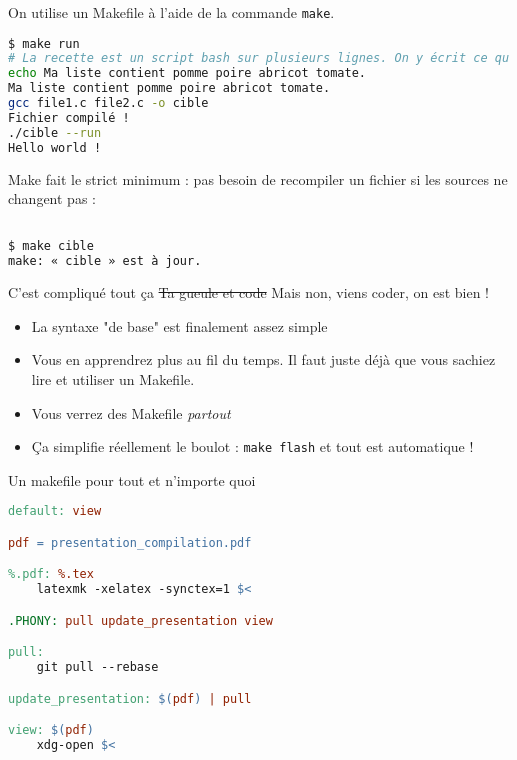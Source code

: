 \begin{frame}[fragile]
\frametitle{\insertsubsubsection}

On utilise un Makefile à l'aide de la commande \texttt{make}.

\begin{lstlisting}[language=bash]
$ make run
# La recette est un script bash sur plusieurs lignes. On y écrit ce qu'on veut.
echo Ma liste contient pomme poire abricot tomate.
Ma liste contient pomme poire abricot tomate.
gcc file1.c file2.c -o cible
Fichier compilé !
./cible --run
Hello world !
\end{lstlisting}



Make fait le strict minimum : pas besoin de recompiler un fichier si les sources ne changent pas :

\begin{lstlisting}[language=bash]

$ make cible
make: « cible » est à jour.
\end{lstlisting}
\end{frame}

\begin{frame}{C'est compliqué tout ça\…}
\sout{Ta gueule et code} Mais non, viens coder, on est bien !

\begin{itemize}
  \item La syntaxe "de base" est finalement assez simple
  \item Vous en apprendrez plus au fil du temps. Il faut juste déjà que vous sachiez lire et utiliser un Makefile.
  \item Vous verrez des Makefile \textit{partout}
  \item Ça simplifie réellement le boulot : \texttt{make flash} et tout est automatique !
\end{itemize}

\end{frame}

\begin{frame}[fragile]{Un makefile pour tout et n'importe quoi}
\begin{lstlisting}[language=make]
default: view

pdf = presentation_compilation.pdf

%.pdf: %.tex
    latexmk -xelatex -synctex=1 $<

.PHONY: pull update_presentation view

pull:
    git pull --rebase

update_presentation: $(pdf) | pull

view: $(pdf)
    xdg-open $<


\end{lstlisting}
\end{frame}


